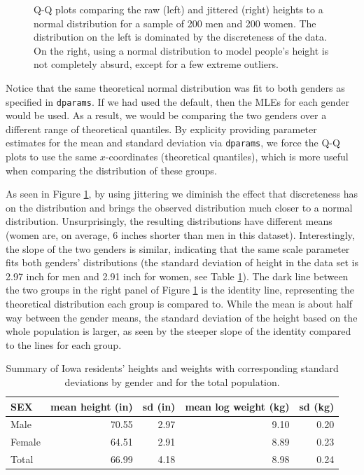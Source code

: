 \begin{Schunk}
\begin{figure}
{}

\caption[Q-Q plots comparing the raw (left) and jittered (right) heights to a normal distribution for a sample of 200 men and 200 women]{Q-Q plots comparing the raw (left) and jittered (right) heights to a normal distribution for a sample of 200 men and 200 women. The distribution on the left is dominated by the discreteness of the data. On the right, using a normal distribution to model people's height is not completely absurd, except for a few extreme outliers.}\label{fig:heights}
\end{figure}
\end{Schunk}

Notice that the same theoretical normal distribution was fit to both
genders as specified in \texttt{dparams}. If we had used the default,
then the MLEs for each gender would be used. As a result, we would be
comparing the two genders over a different range of theoretical
quantiles. By explicity providing parameter estimates for the mean and
standard deviation via \texttt{dparams}, we force the Q-Q plots to use
the same \(x\)-coordinates (theoretical quantiles), which is more useful
when comparing the distribution of these groups.

As seen in Figure \ref{fig:heights}, by using jittering we diminish the
effect that discreteness has on the distribution and brings the observed
distribution much closer to a normal distribution. Unsurprisingly, the
resulting distributions have different means (women are, on average, 6
inches shorter than men in this dataset). Interestingly, the slope of
the two genders is similar, indicating that the same scale parameter
fits both genders' distributions (the standard deviation of height in
the data set is 2.97 inch for men and 2.91 inch for women, see Table
\ref{tab:heights}). The dark line between the two groups in the right
panel of Figure \ref{fig:heights} is the identity line, representing the
theoretical distribution each group is compared to. While the mean is
about half way between the gender means, the standard deviation of the
height based on the whole population is larger, as seen by the steeper
slope of the identity compared to the lines for each group.

\begin{table}

\caption{\label{tab:heights-table}Summary of Iowa residents' heights and weights with corresponding standard deviations by gender and for the total population.\label{tab:heights}}
\centering
\begin{tabular}[t]{lrrrr}
\toprule
SEX & mean height (in) & sd (in) & mean log weight (kg) & sd (kg)\\
\midrule
Male & 70.55 & 2.97 & 9.10 & 0.20\\
Female & 64.51 & 2.91 & 8.89 & 0.23\\
Total & 66.99 & 4.18 & 8.98 & 0.24\\
\bottomrule
\end{tabular}
\end{table}

